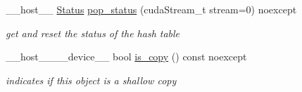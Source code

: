 \begin{DoxyCompactItemize}
\+\_\+\+\_\+host\+\_\+\+\_\+ \hyperlink{classwarpcore_1_1Status}{Status} \hyperlink{classwarpcore_1_1HashSet_ae9a6c692c64bbc40bb6abd3372b946d1}{pop\+\_\+status} (cuda\+Stream\+\_\+t stream=0) noexcept
\begin{DoxyCompactList}\small\item\em get and reset the status of the hash table \end{DoxyCompactList}\item 
\+\_\+\+\_\+host\+\_\+\+\_\+\+\_\+\+\_\+device\+\_\+\+\_\+ bool \hyperlink{classwarpcore_1_1HashSet_ac1b20d9d5305bbd8e7fca93aa580c984}{is\+\_\+copy} () const noexcept
\begin{DoxyCompactList}\small\item\em indicates if this object is a shallow copy \end{DoxyCompactList}\end{DoxyCompactItemize}
